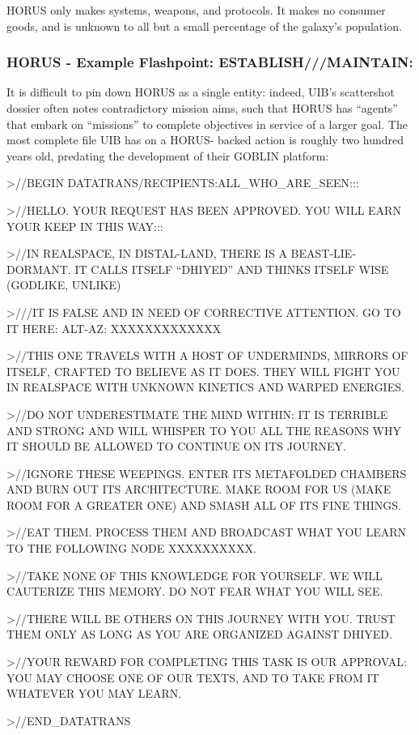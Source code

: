 HORUS only makes systems, weapons, and protocols. It makes no consumer goods, and is
unknown to all but a small percentage of the galaxy's population.

\subsubsection[Example Flashpoint: ESTABLISH///MAINTAIN:]{HORUS - Example Flashpoint: ESTABLISH///MAINTAIN:}

It is difficult to pin down HORUS as a single entity: indeed, UIB's scattershot dossier often notes
contradictory mission aims, such that HORUS has ``agents'' that embark on ``missions'' to
complete objectives in service of a larger goal. The most complete file UIB has on a HORUS-
backed action is roughly two hundred years old, predating the development of their GOBLIN
platform:

\begin{loreQuote}
\upshape
                 >//BEGIN DATATRANS/RECIPIENTS:ALL\_WHO\_ARE\_SEEN:::
                 \par
                 >//HELLO. YOUR REQUEST HAS BEEN APPROVED. YOU WILL EARN YOUR KEEP IN
                 THIS WAY:::

                 >//IN REALSPACE, IN DISTAL-LAND, THERE IS A BEAST-LIE-DORMANT. IT CALLS
                 ITSELF ``DHIYED'' AND THINKS ITSELF WISE (GODLIKE, UNLIKE)

                 >///IT IS FALSE AND IN NEED OF CORRECTIVE ATTENTION. GO TO IT HERE: ALT-AZ:
                 XXXXXXXXXXXXX

                 >//THIS ONE TRAVELS WITH A HOST OF UNDERMINDS, MIRRORS OF ITSELF,
                 CRAFTED TO BELIEVE AS IT DOES. THEY WILL FIGHT YOU IN REALSPACE WITH
                 UNKNOWN KINETICS AND WARPED ENERGIES.

                 >//DO NOT UNDERESTIMATE THE MIND WITHIN: IT IS TERRIBLE AND STRONG AND
                 WILL WHISPER TO YOU ALL THE REASONS WHY IT SHOULD BE ALLOWED TO
                 CONTINUE ON ITS JOURNEY.

                 >//IGNORE THESE WEEPINGS. ENTER ITS METAFOLDED CHAMBERS AND BURN OUT
                 ITS ARCHITECTURE. MAKE ROOM FOR US (MAKE ROOM FOR A GREATER ONE) AND
                 SMASH ALL OF ITS FINE THINGS.

                 >//EAT THEM. PROCESS THEM AND BROADCAST WHAT YOU LEARN TO THE
                 FOLLOWING NODE XXXXXXXXXX.

                 >//TAKE NONE OF THIS KNOWLEDGE FOR YOURSELF. WE WILL CAUTERIZE THIS
                 MEMORY. DO NOT FEAR WHAT YOU WILL SEE.

                 >//THERE WILL BE OTHERS ON THIS JOURNEY WITH YOU. TRUST THEM ONLY AS
                 LONG AS YOU ARE ORGANIZED AGAINST DHIYED.

                 >//YOUR REWARD FOR COMPLETING THIS TASK IS OUR APPROVAL: YOU MAY
                 CHOOSE ONE OF OUR TEXTS, AND TO TAKE FROM IT WHATEVER YOU MAY LEARN.

                 >//END\_DATATRANS
\end{loreQuote}

